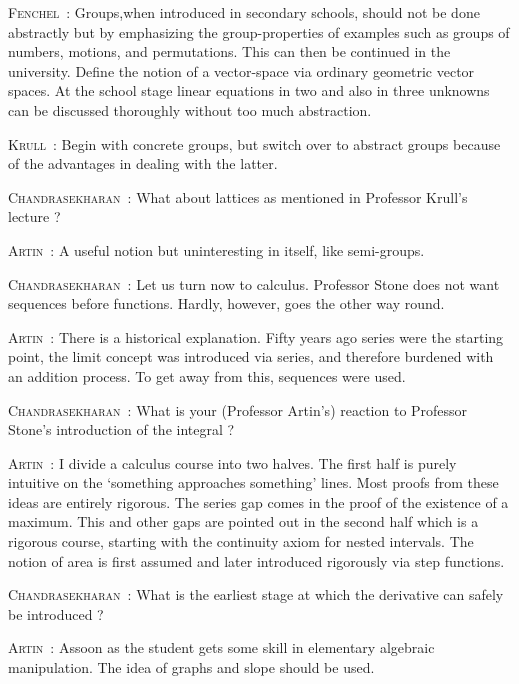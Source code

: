 \smallskip
\noindent
\textsc{Fenchel}~: Groups,\pageoriginale when introduced in secondary schools, should not be done abstractly but by emphasizing the group-properties of examples such as groups of numbers, motions, and permutations. This can then be continued in the university. Define the notion of a vector-space via ordinary geometric vector spaces. At the school stage linear equations in two and also in three unknowns can be discussed thoroughly without too much abstraction.

\smallskip
\noindent
\textsc{Krull}~: Begin with concrete groups, but switch over to abstract groups because of the advantages in dealing with the latter.

\smallskip
\noindent
\textsc{Chandrasekharan}~: What about lattices as mentioned in Professor Krull's lecture ?

\smallskip
\noindent
\textsc{Artin}~: A useful notion but uninteresting in itself, like semi-groups.

\smallskip
\noindent
\textsc{Chandrasekharan}~: Let us turn now to calculus. Professor Stone does not want sequences before functions. Hardly, however, goes the other way round.

\smallskip
\noindent
\textsc{Artin}~: There is a historical explanation. Fifty years ago series were the starting point, the limit concept was introduced via series, and therefore burdened with an addition process. To get away from this, sequences were used.

\smallskip
\noindent
\textsc{Chandrasekharan}~: What is your (Professor Artin's) reaction to Professor Stone's introduction of the integral ?

\smallskip
\noindent
\textsc{Artin}~: I divide a calculus course into two halves. The first half is purely intuitive on the `something approaches something' lines. Most proofs from these ideas are entirely rigorous. The series gap comes in the proof of the existence of a maximum. This and other gaps are pointed out in the second half which is a rigorous course, starting with the continuity axiom for nested intervals. The notion of area is first assumed and later introduced rigorously via step functions.

\smallskip
\noindent
\textsc{Chandrasekharan}~: What is the earliest stage at which the derivative can safely be introduced ? 

\smallskip
\noindent
\textsc{Artin}~: As\pageoriginale soon as the student gets some skill in elementary algebraic manipulation. The idea of graphs and slope should be used.

